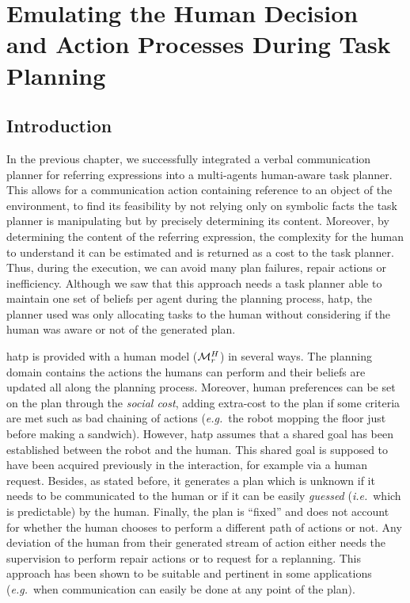\documentclass[a4paper,11pt,twoside]{StyleThese}
\begin{document}
\setcounter{chapter}{3} %
\dominitoc
\faketableofcontents
\fi

\chapter{Emulating the Human Decision and Action Processes During Task Planning}
\label{chapter:doublehtn}
\minitoc

\section{Introduction}
In the previous chapter, we successfully integrated a verbal communication planner for referring expressions into a multi-agents human-aware task planner. This allows for a communication action containing reference to an object of the environment, to find its feasibility by not relying only on symbolic facts the task planner is manipulating but by precisely determining its content. Moreover, by determining the content of the referring expression, the complexity for the human to understand it can be estimated and is returned as a cost to the task planner. Thus, during the execution, we can avoid many plan failures, repair actions or inefficiency. Although we saw that this approach needs a task planner able to maintain one set of beliefs per agent during the planning process, \acrshort{hatp}, the planner used was only allocating tasks to the human without considering if the human was aware or not of the generated plan.

\acrshort{hatp} is provided with a human model ($\mathcal{M}^H_r$) in several ways. The planning domain contains the actions the humans can perform and their beliefs are updated all along the planning process. Moreover, human preferences can be set on the plan through the \textit{social cost}, adding extra-cost to the plan if some criteria are met such as bad chaining of actions (\textit{e.g.}~the robot mopping the floor just before making a sandwich). However, \acrshort{hatp} assumes that a shared goal has been established between the robot and the human. This shared goal is supposed to have been acquired previously in the interaction, for example via a human request. Besides, as stated before, it generates a plan which is unknown if it needs to be communicated to the human or if it can be easily \textit{guessed} (\textit{i.e.}~which is predictable) by the human. Finally, the plan is ``fixed'' and does not account for whether the human chooses to perform a different path of actions or not. Any deviation of the human from their generated stream of action either needs the supervision to perform repair actions or to request for a replanning. This approach has been shown to be suitable and pertinent in some applications (\textit{e.g.}~when communication can easily be done at any point of the plan).
\end{document}

